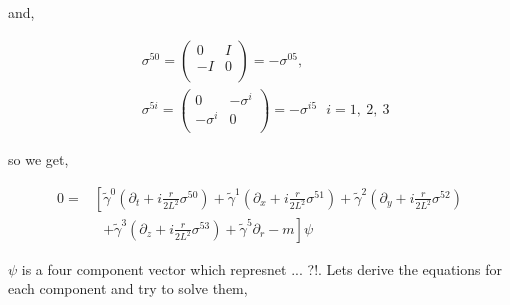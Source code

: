 and,

\begin{align}
   &\sigma^{50} = \begin{pmatrix} 0 & I \\ -I & 0 \\ \end{pmatrix} = -\sigma^{05}, \quad \nonumber\\
   &\sigma^{5i} = \begin{pmatrix} 0 & -\sigma^i \\ -\sigma^i & 0 \\ \end{pmatrix}= -\sigma^{i5} ~~~ i=1,~2,~3 
\end{align}

so we get,

\begin{align}
   0 =& \left[ \tilde{\gamma}^0 \left(\partial_t + i\frac{r}{2L^2}\sigma^{50} \right) + \tilde{\gamma}^1 \left(\partial_x + i\frac{r}{2L^2}\sigma^{51} \right) + \tilde{\gamma}^2 \left(\partial_y + i\frac{r}{2L^2}\sigma^{52} \right) \right. \nonumber\\
      & ~~~  \left. + \tilde{\gamma}^3 \left(\partial_z + i\frac{r}{2L^2}\sigma^{53} \right) + \tilde{\gamma}^5 \partial_r - m\right] \psi
\end{align}

$\psi$ is a four component vector which represnet ... ?!. Lets derive the equations for each component and try to solve them, 

